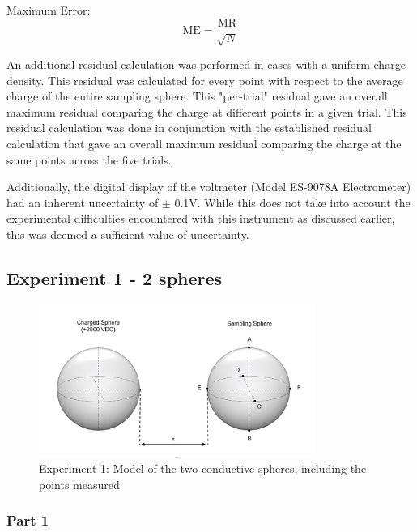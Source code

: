 Maximum Error: 
$$\mathrm{ME}=\frac{\mathrm{MR}}{\sqrt{N}}$$


An additional residual calculation was performed in cases with a uniform charge density. This residual was calculated for every point with respect to the average charge of the entire sampling sphere. This "per-trial" residual gave an overall maximum residual comparing the charge at different points in a given trial. This residual calculation was done in conjunction with the established residual calculation that gave an overall maximum residual comparing the charge at the same points across the five trials.

Additionally, the digital display of the voltmeter (Model ES-9078A Electrometer) had an inherent uncertainty of $\pm$ 0.1V. While this does not take into account the experimental difficulties encountered with this instrument as discussed earlier, this was deemed a sufficient value of uncertainty. 

\newpage

\subsection{Experiment 1 - 2 spheres}

\begin{figure}[h]
    \centering
    \includegraphics[height=5cm]{photos/experiment1image.png} %
    \caption{Experiment 1: Model of the two conductive spheres, including the points measured}
    \label{fig:experiment1}
\end{figure}


\subsubsection{Part 1}

